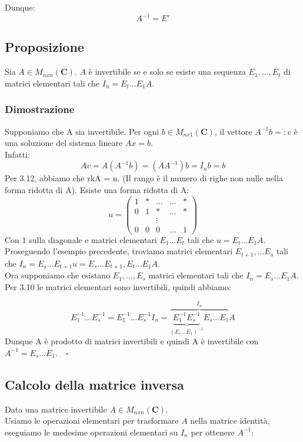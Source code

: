 \documentclass[12pt]{article}
\begin{document}
Dunque: \[A^{-1} = E'\]

\subsection{Proposizione}

Sia $A \in M_{nxn} (\mathbf{C})$. $A$ è invertibile se e solo se esiste una sequenza $E_1, ..., E_t$ di matrici elementari tali che $I_n = E_t ... E_1 A$.

\subsubsection{Dimostrazione}

Supponiamo che A sia invertibile. Per ogni $b \in M_{nx1} (\mathbf{C})$, il vettore $A^{-1}b =: v$ è una soluzione del sistema lineare $Ax = b$.\\
Infatti: \[Av = A(A^{-1}b) = (AA^{-1})b = I_nb = b\]
Per 3.12, abbiamo che rkA = n. (Il rango è il numero di righe non nulle nella forma ridotta di A). Esiste una forma ridotta di A:
\[u = \begin{pmatrix}
    1 & * & ... & ... & *\\
    0 & 1 & * & ... & *\\
    & & \vdots & &\\
    0 & 0 & 0 & ... & 1
\end{pmatrix}\]
Con 1 sulla diagonale e matrici elementari $E_1 ... E_t$ tali che $u = E_t ... E_1A$.\\
Proseguendo l'esempio precedente, troviamo matrici elementari $E_{t+1}, ... E_s$ tali che $I_n = E_s ... E_{t+1}u = E_s ... E_{t+1}, E_t ... E_1A$.\\
Ora supponiamo che esistano $E_1,...,E_s$ matrici elementari tali che $I_n = E_s ... E_1A$.\\
Per 3.10 le matrici elementari sono invertibili, quindi abbiamo:

\[E_1^{-1} \dots E_s^{-1} = E_1^{-1}... E_s^{-1}I_n = \overbrace{\underbrace{E_1^{-1}E_s^{-1}}_{(E_s \dots E_1)^{-1}}E_s ... E_1}^{I_n}A\]
Dunque A è prodotto di matrici invertibili e quindi A è invertibile con $A^{-1} = E_s ... E_1. \quad \square$

\subsection{Calcolo della matrice inversa}

Data una matrice invertibile $A \in M_{nxn} (\mathbf{C})$.\\
Usiamo le operazioni elementari per trasformare $A$ nella matrice identità, eseguiamo le medesime operazioni elementari su $I_n$ per ottenere $A^{-1}:$
\end{document}
